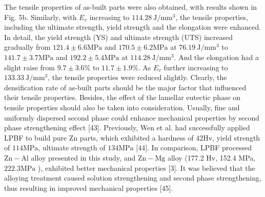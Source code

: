\documentclass[10pt]{article}
\begin{document}
The tensile properties of as-built parts were also obtained, with results shown in Fig. 5b. Similarly, with $E_{v}$ increasing to $114.28 \mathrm{~J} / \mathrm{mm}^{3}$, the tensile properties, including the ultimate strength, yield strength and the elongation were enhanced. In detail, the yield strength (YS) and ultimate strength (UTS) increased gradually from $121.4 \pm 6.6 \mathrm{MPa}$ and $170.5 \pm 6.2 \mathrm{MPa}$ at $76.19 \mathrm{~J} / \mathrm{mm}^{3}$ to $141.7 \pm 3.7 \mathrm{MPa}$ and $192.2 \pm 5.4 \mathrm{MPa}$ at $114.28 \mathrm{~J} / \mathrm{mm}^{3}$. And the elongation had a slight raise from $9.7 \pm 3.6 \%$ to $11.7 \pm 1.9 \%$. As $E_{v}$ further increasing to $133.33 \mathrm{~J} / \mathrm{mm}^{3}$, the tensile properties were reduced slightly. Clearly, the densification rate of as-built parts should be the major factor that influenced their tensile properties. Besides, the effect of the lamellar eutectic phase on tensile properties should also be taken into consideration. Usually, fine and uniformly dispersed second phase could enhance mechanical properties by second phase strengthening effect [43]. Previously, Wen et al. had successfully applied LPBF to build pure $\mathrm{Zn}$ parts, which exhibited a hardness of $42 \mathrm{Hv}$, yield strength of $114 \mathrm{MPa}$, ultimate strength of $134 \mathrm{MPa}$ [44]. In comparison, LPBF processed $\mathrm{Zn}-\mathrm{Al}$ alloy presented in this study, and $\mathrm{Zn}-\mathrm{Mg}$ alloy (177.2 Hv, 152.4 MPa, $222.3 \mathrm{MPa}$ ), exhibited better mechanical properties [3]. It was believed that the alloying treatment caused solution strengthening and second phase strengthening, thus resulting in improved mechanical properties [45].
\end{document}
